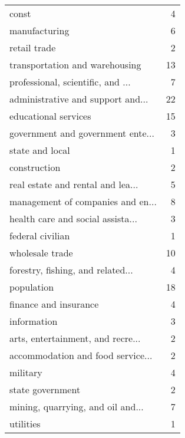 \begin{tabular}{lr}
\hline
 const                             &  4 \\
 manufacturing                     &  6 \\
 retail trade                      &  2 \\
 transportation and warehousing    & 13 \\
 professional, scientific, and ... &  7 \\
 administrative and support and... & 22 \\
 educational services              & 15 \\
 government and government ente... &  3 \\
 state and local                   &  1 \\
 construction                      &  2 \\
 real estate and rental and lea... &  5 \\
 management of companies and en... &  8 \\
 health care and social assista... &  3 \\
 federal civilian                  &  1 \\
 wholesale trade                   & 10 \\
 forestry, fishing, and related... &  4 \\
 population                        & 18 \\
 finance and insurance             &  4 \\
 information                       &  3 \\
 arts, entertainment, and recre... &  2 \\
 accommodation and food service... &  2 \\
 military                          &  4 \\
 state government                  &  2 \\
 mining, quarrying, and oil and... &  7 \\
 utilities                         &  1 \\
\hline
\end{tabular}